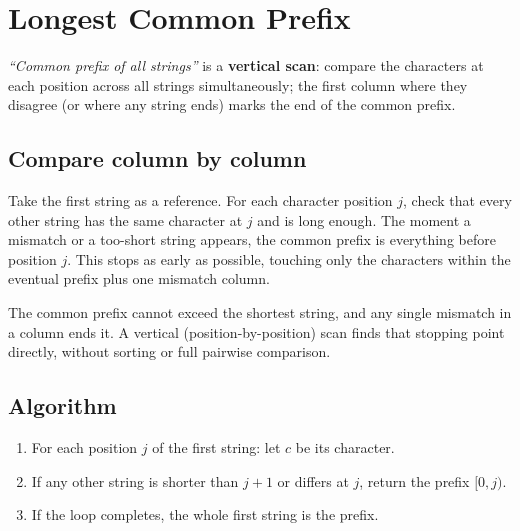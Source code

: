 \section{Longest Common Prefix}
\label{sec:str-longest-common-prefix}


\begin{patternbox}
\emph{``Common prefix of all strings''} is a \textbf{vertical scan}: compare
the characters at each position across all strings simultaneously; the first
column where they disagree (or where any string ends) marks the end of the
common prefix.
\end{patternbox}

\subsection*{Compare column by column}

Take the first string as a reference. For each character position $j$,
check that every other string has the same character at $j$ and is long
enough. The moment a mismatch or a too-short string appears, the common
prefix is everything before position $j$. This stops as early as possible,
touching only the characters within the eventual prefix plus one mismatch
column.

\begin{ideabox}
The common prefix cannot exceed the shortest string, and any single
mismatch in a column ends it. A vertical (position-by-position) scan finds
that stopping point directly, without sorting or full pairwise comparison.
\end{ideabox}

\subsection*{Algorithm}

\begin{enumerate}
  \item For each position $j$ of the first string: let $c$ be its
        character.
  \item If any other string is shorter than $j+1$ or differs at $j$, return
        the prefix $[0,j)$.
  \item If the loop completes, the whole first string is the prefix.
\end{enumerate}

